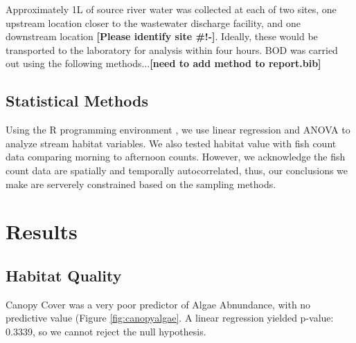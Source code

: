 \documentclass{article}\usepackage[]{graphicx}\usepackage[]{color}
\begin{document}
Approximately 1L of source river water was collected at each of two sites, one upstream location closer to the wastewater discharge facility, and one downstream location \textbf{[Please identify site \#!-]}. Ideally, these would be transported to the laboratory for analysis within four hours. BOD was carried out using the following methods...\textbf{[need to add method to report.bib]}

\subsection{Statistical Methods}

Using the R programming environment \citep{CRAN}, we use linear regression and ANOVA to analyze stream habitat variables. We also tested habitat value with fish count data comparing morning to afternoon counts. However, we acknowledge the fish count data are spatially and temporally autocorrelated, thus, our conclusions we make are serverely constrained based on the sampling methods.

\section{Results}



\subsection{Habitat Quality}

Canopy Cover was a very poor predictor of Algae Abnundance, with no predictive value (Figure \ref{fig:canopyalgae}. A linear regression yielded p-value: 0.3339, so we cannot reject the null hypothesis.
\end{document}
